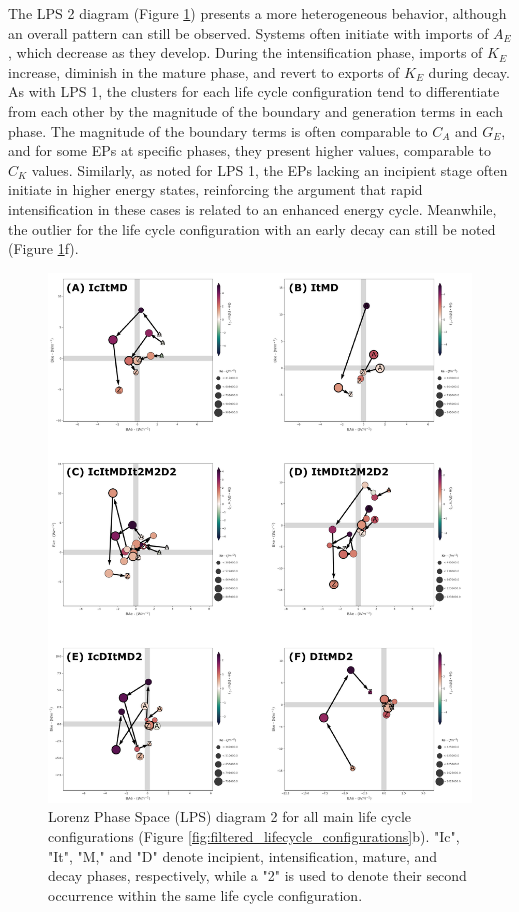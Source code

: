 The LPS 2 diagram (Figure \ref{fig:lps_imports_all_systems_zoom}) presents a more heterogeneous behavior, although an overall pattern can still be observed. Systems often initiate with imports of $A_E$, which decrease as they develop. During the intensification phase, imports of $K_E$ increase, diminish in the mature phase, and revert to exports of $K_E$ during decay. As with LPS 1, the clusters for each life cycle configuration tend to differentiate from each other by the magnitude of the boundary and generation terms in each phase. The magnitude of the boundary terms is often comparable to $C_A$ and $G_E$, and for some EPs at specific phases, they present higher values, comparable to $C_K$ values. Similarly, as noted for LPS 1, the EPs lacking an incipient stage often initiate in higher energy states, reinforcing the argument that rapid intensification in these cases is related to an enhanced energy cycle. Meanwhile, the outlier for the life cycle configuration with an early decay can still be noted (Figure \ref{fig:lps_imports_all_systems_zoom}f).

\begin{figure}[!htbp]
\centering
\includegraphics[width=\textwidth]{figs_6/lps_imports_clusters_all_life_cycles.pdf}
\caption[LPS 2 - Clusters - All Life Cycle Configurations]{Lorenz Phase Space (LPS) diagram 2 for all main life cycle configurations (Figure \ref{fig:filtered_lifecycle_configurations}b). "Ic", "It", "M," and "D" denote incipient, intensification, mature, and decay phases, respectively, while a "2" is used to denote their second occurrence within the same life cycle configuration.}
\label{fig:lps_imports_all_systems_zoom}
\end{figure}

